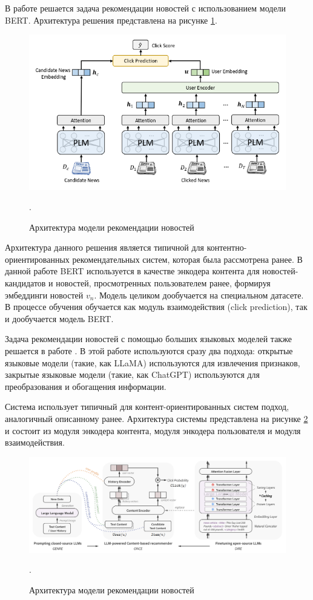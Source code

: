 В работе \cite{news_rec_bert} решается задача рекомендации новостей с использованием модели BERT. Архитектура решения представлена  на рисунке \ref{img:news_rec_bert}.

\begin{figure}[h]
    \centering
    \includegraphics[width=\linewidth]{../images/news_rec_bert.png}
    \caption{Архитектура модели рекомендации новостей \cite{news_rec_bert}}.
    \label{img:news_rec_bert}
\end{figure}

Архитектура данного решения является типичной для контентно-ориентированных рекомендательных систем, которая была рассмотрена ранее. В данной работе BERT используется в качестве энкодера контента для новостей-кандидатов и новостей, просмотренных пользователем ранее, формируя эмбеддинги новостей $v_n$. Модель целиком дообучается на специальном датасете. В процессе обучения обучается как модуль взаимодействия (click prediction), так и дообучается модель BERT.

Задача рекомендации новостей с помощью больших языковых моделей также решается в работе \cite{news_rec_gen}. В этой работе используются сразу два подхода: открытые языковые модели (такие, как LLaMA) используются для извлечения признаков, закрытые языковые модели (такие, как ChatGPT) используются для преобразования и обогащения информации.

Система использует типичный для контент-ориентированных систем подход, аналогичный описанному ранее. Архитектура системы представлена на рисунке \ref{img:news_rec_gen} и состоит из модуля энкодера контента, модуля энкодера пользователя и модуля взаимодействия.

\begin{figure}[h]
    \centering
    \includegraphics[width=\linewidth]{../images/news_rec_gen.png}
    \caption{Архитектура модели рекомендации новостей \cite{news_rec_gen}}.
    \label{img:news_rec_gen}
\end{figure}


